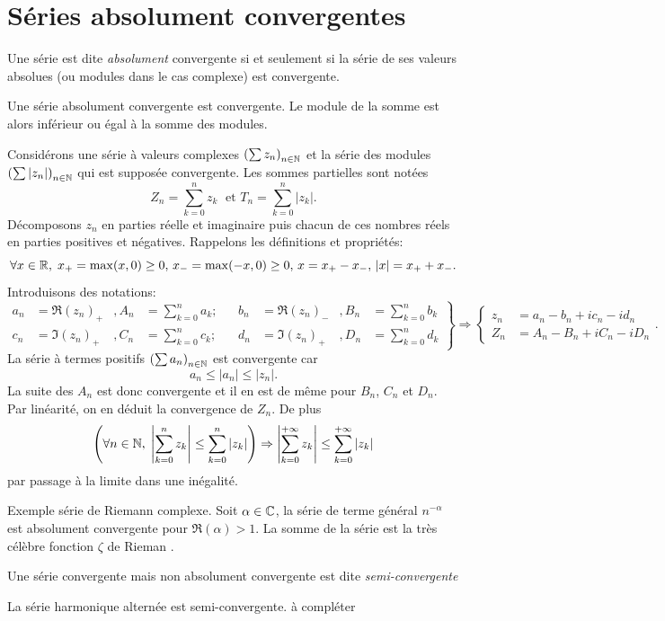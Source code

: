 \section{Séries absolument convergentes}
\begin{defi}
  Une série est dite \emph{absolument} convergente si et seulement si la série de ses valeurs absolues (ou modules dans le cas complexe) est convergente.
\end{defi}
\begin{prop}
  Une série absolument convergente est convergente. Le module de la somme est alors inférieur ou égal à la somme des modules.
\end{prop}
\begin{demo}
Considérons une série à valeurs complexes $\left( \sum z_n\right)_{n \in \mathbb{N}}$ et la série des modules $\left( \sum |z_n|\right)_{n \in \mathbb{N}}$ qui est supposée convergente. Les sommes partielles sont notées
\[
 Z_n = \sum_{k=0}^n z_k\; \text{ et } T_n = \sum_{k=0}^n |z_k|.
\]
Décomposons $z_n$ en parties réelle et imaginaire puis chacun de ces nombres réels en parties positives et négatives. Rappelons les définitions et propriétés:
\[
 \forall x \in \mathbb{R},\; x_+ = \max(x,0)\geq 0, \, x_- = \max(-x,0) \geq 0,\, x = x_+ - x_-,\, |x| = x_+ + x_-.  
\]
Introduisons des notations:
\[
\left. 
\begin{aligned}
 a_n &= \Re(z_n)_+ &, A_n &= \sum_{k=0}^n a_k ; & &
 b_n &= \Re(z_n)_- &, B_n &= \sum_{k=0}^n b_k \\
 c_n &= \Im(z_n)_+ &, C_n &= \sum_{k=0}^n c_k ; & &
 d_n &= \Im(z_n)_+ &, D_n &= \sum_{k=0}^n d_k 
\end{aligned}
\right\rbrace \Rightarrow 
\left\lbrace 
\begin{aligned}
z_n &= a_n - b_n + ic_n -id_n \\
Z_n &= A_n - B_n + iC_n -iD_n
\end{aligned}
\right. .
\]
La série à termes positifs $\left( \sum a_n\right)_{n \in \mathbb{N}}$ est convergente car 
\[
 a_n \leq |a_n| \leq |z_n| .
\]
La suite des $A_n$ est donc convergente et il en est de même pour $B_n$, $C_n$ et $D_n$. Par linéarité, on en déduit la convergence de $Z_n$.\newline
De plus
\[
 \left( \forall n \in \mathbb{N}, \; \left| \sum_{k=0}^{n} z_k \right| \leq \sum_{k=0}^{n} |z_k|\right)  
 \Rightarrow 
 \left| \sum_{k=0}^{+\infty} z_k \right| \leq \sum_{k=0}^{+\infty} |z_k|
\]
par passage à la limite dans une inégalité.
\end{demo}
Exemple série de Riemann complexe. Soit $\alpha\in \mathbb{C}$, la série de terme général $n^{-\alpha}$ est absolument convergente pour $\Re(\alpha)>1$. La somme de la série est la très célèbre fonction $\zeta$ de Rieman .
\begin{defi}
  Une série convergente mais non absolument convergente est dite \emph{semi-convergente}
\end{defi}
\begin{exple}
La série harmonique alternée est semi-convergente.
à compléter 
\end{exple}


